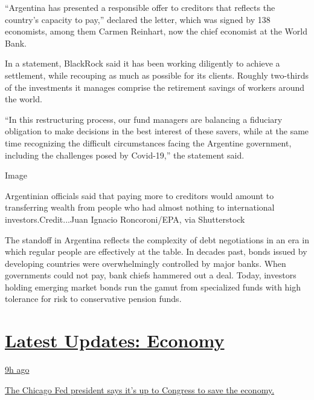 ``Argentina has presented a responsible offer to creditors that reflects
the country's capacity to pay,'' declared the letter, which was signed
by 138 economists, among them Carmen Reinhart, now the chief economist
at the World Bank.

In a statement, BlackRock said it has been working diligently to achieve
a settlement, while recouping as much as possible for its clients.
Roughly two-thirds of the investments it manages comprise the retirement
savings of workers around the world.

``In this restructuring process, our fund managers are balancing a
fiduciary obligation to make decisions in the best interest of these
savers, while at the same time recognizing the difficult circumstances
facing the Argentine government, including the challenges posed by
Covid-19,'' the statement said.

Image

Argentinian officials said that paying more to creditors would amount to
transferring wealth from people who had almost nothing to international
investors.Credit...Juan Ignacio Roncoroni/EPA, via Shutterstock

The standoff in Argentina reflects the complexity of debt negotiations
in an era in which regular people are effectively at the table. In
decades past, bonds issued by developing countries were overwhelmingly
controlled by major banks. When governments could not pay, bank chiefs
hammered out a deal. Today, investors holding emerging market bonds run
the gamut from specialized funds with high tolerance for risk to
conservative pension funds.

\hypertarget{latest-updates-economy}{%
\section{\texorpdfstring{\href{https://www.nytimes.com/live/2020/08/03/business/stock-market-today-coronavirus?action=click\&pgtype=Article\&state=default\&region=MAIN_CONTENT_1\&context=storylines_live_updates}{Latest
Updates:
Economy}}{Latest Updates: Economy}}\label{latest-updates-economy}}

\href{https://www.nytimes.com/live/2020/08/03/business/stock-market-today-coronavirus?action=click\&pgtype=Article\&state=default\&region=MAIN_CONTENT_1\&context=storylines_live_updates\#the-chicago-fed-president-says-its-up-to-congress-to-save-the-economy}{9h
ago}

\href{https://www.nytimes.com/live/2020/08/03/business/stock-market-today-coronavirus?action=click\&pgtype=Article\&state=default\&region=MAIN_CONTENT_1\&context=storylines_live_updates\#the-chicago-fed-president-says-its-up-to-congress-to-save-the-economy}{The
Chicago Fed president says it's up to Congress to save the economy.}

